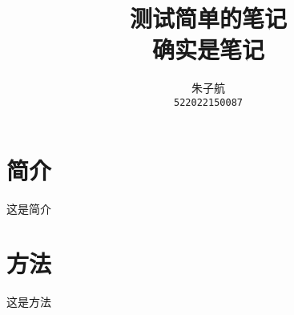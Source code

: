 \documentclass{si_template/cn_note}
\title{\Huge 测试简单的笔记 \\ \huge 确实是笔记}
\author{\hspace{1mm}朱子航\\\texttt{522022150087}}
\begin{document}
\maketitle
\section{简介}\label{sec:introduction}
这是简介
\section{方法}\label{sec:method}
这是方法
\end{document}
